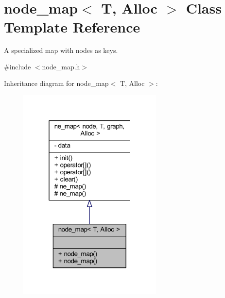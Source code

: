 \hypertarget{classnode__map}{}\section{node\+\_\+map$<$ T, Alloc $>$ Class Template Reference}
\label{classnode__map}


A specialized map with nodes as keys.  




{\ttfamily \#include $<$node\+\_\+map.\+h$>$}



Inheritance diagram for node\+\_\+map$<$ T, Alloc $>$\+:\nopagebreak
\begin{figure}[H]
\begin{center}
\leavevmode
\includegraphics[width=205pt]{classnode__map__inherit__graph}
\end{center}
\end{figure}


